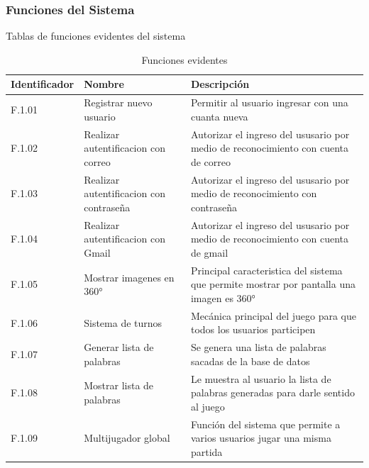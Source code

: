 \subsubsection{Funciones del Sistema}

Tablas de funciones evidentes del sistema
\begin{table}[H]
    \begin{center}
        \begin{tabular}{| m{2.3cm} | m{5cm} | m{8cm} |}        
        	\hline 
        	Identificador & Nombre & Descripción\\
        	\hline
        	F.1.01 & Registrar nuevo usuario & Permitir al usuario ingresar con una cuanta nueva\\
        	\hline
        	F.1.02 & Realizar autentificacion con correo & Autorizar el ingreso del ususario por medio de reconocimiento con cuenta de correo\\
        	\hline
        	F.1.03 & Realizar autentificacion con contraseña & Autorizar el ingreso del ususario por medio de reconocimiento con contraseña\\
        	\hline
        	F.1.04 & Realizar autentificacion con Gmail & Autorizar el ingreso del ususario por medio de reconocimiento con cuenta de gmail\\
        	\hline
        	F.1.05 & Mostrar imagenes en 360° & Principal caracteristica del sistema que permite mostrar por pantalla una imagen es 360°\\
        	\hline
        	F.1.06 & Sistema de turnos & Mecánica principal del juego para que todos los usuarios participen\\
        	\hline
        	F.1.07 & Generar lista de palabras & Se genera una lista de palabras sacadas de la base de datos\\
        	\hline
        	F.1.08 & Mostrar lista de palabras & Le muestra al usuario la lista de palabras generadas para darle sentido al juego\\
        	\hline
        	F.1.09 & Multijugador global & Función del sistema que permite a varios usuarios jugar una misma partida\\
        	\hline
        \end{tabular}
    \caption{Funciones evidentes}
    \end{center}
\end{table}


